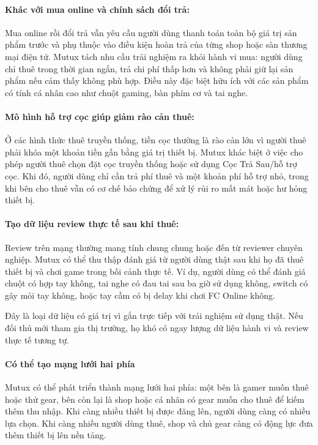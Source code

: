 \paragraph{Khác với mua online và chính sách đổi trả:}

Mua online rồi đổi trả vẫn yêu cầu người dùng thanh toán toàn bộ giá trị sản phẩm trước và phụ thuộc vào điều kiện hoàn trả của từng shop hoặc sàn thương mại điện tử. Mutux tách nhu cầu trải nghiệm ra khỏi hành vi mua: người dùng chỉ thuê trong thời gian ngắn, trả chi phí thấp hơn và không phải giữ lại sản phẩm nếu cảm thấy không phù hợp. Điều này đặc biệt hữu ích với các sản phẩm có tính cá nhân cao như chuột gaming, bàn phím cơ và tai nghe.

\paragraph{Mô hình hỗ trợ cọc giúp giảm rào cản thuê:}

Ở các hình thức thuê truyền thống, tiền cọc thường là rào cản lớn vì người thuê phải khóa một khoản tiền gần bằng giá trị thiết bị. Mutux khác biệt ở việc cho phép người thuê chọn đặt cọc truyền thống hoặc sử dụng Cọc Trả Sau/hỗ trợ cọc. Khi đó, người dùng chỉ cần trả phí thuê và một khoản phí hỗ trợ nhỏ, trong khi bên cho thuê vẫn có cơ chế bảo chứng để xử lý rủi ro mất mát hoặc hư hỏng thiết bị.

\paragraph{Tạo dữ liệu review thực tế sau khi thuê:}

Review trên mạng thường mang tính chung chung hoặc đến từ reviewer chuyên nghiệp. Mutux có thể thu thập đánh giá từ người dùng thật sau khi họ đã thuê thiết bị và chơi game trong bối cảnh thực tế. Ví dụ, người dùng có thể đánh giá chuột có hợp tay không, tai nghe có đau tai sau ba giờ sử dụng không, switch có gây mỏi tay không, hoặc tay cầm có bị delay khi chơi FC Online không.

Đây là loại dữ liệu có giá trị vì gắn trực tiếp với trải nghiệm sử dụng thật. Nếu đối thủ mới tham gia thị trường, họ khó có ngay lượng dữ liệu hành vi và review thực tế tương tự.

\paragraph{Có thể tạo mạng lưới hai phía}

Mutux có thể phát triển thành mạng lưới hai phía: một bên là gamer muốn thuê hoặc thử gear, bên còn lại là shop hoặc cá nhân có gear muốn cho thuê để kiếm thêm thu nhập. Khi càng nhiều thiết bị được đăng lên, người dùng càng có nhiều lựa chọn. Khi càng nhiều người dùng thuê, shop và chủ gear càng có động lực đưa thêm thiết bị lên nền tảng.

